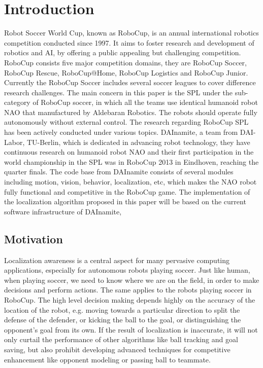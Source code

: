 \chapter{Introduction\label{cha:chapter1}}

Robot Soccer World Cup, known as RoboCup, is an annual international robotics competition conducted since 1997. It aims to foster research and development of robotics and \gls{AI}, by offering a public appealing but challenging competition. RoboCup consists five major competition domains, they are RoboCup Soccer, RoboCup Rescue, RoboCup@Home, RoboCup Logistics and RoboCup Junior. Currently the RoboCup Soccer includes several soccer leagues to cover difference research challenges. The main concern in this paper is the \gls{SPL} under the sub-category of RoboCup soccer, in which all the teams use identical humanoid robot NAO that manufactured by Aldebaran Robotics. The robots should operate fully autonomously without external control. 
The research regarding RoboCup \gls{SPL} has been actively conducted under various topics. DAInamite, a team from DAI-Labor, TU-Berlin, which is dedicated in advancing robot technology, they have continuous research on humanoid robot NAO and their first participation in the world championship in the \gls{SPL} was in RoboCup 2013 in Eindhoven, reaching the quarter finals. The code base from DAInamite consists of several modules including motion, vision, behavior, localization, etc, which makes the NAO robot fully functional and competitive in the RoboCup game.
The implementation of the localization algorithm proposed in this paper will be based on the current software infrastructure of DAInamite,  

\section{Motivation\label{sec:moti}}
Localization awareness is a central aspect for many pervasive computing applications, especially for autonomous robots playing soccer. Just like human,  when playing soccer, we need to know where we are on the field, in order to make decisions and perform actions. The same applies to the robots playing soccer in RoboCup. The high level decision making depends highly on the accuracy of the location of the robot, e.g. moving towards a particular direction to split the defense of the defender, or kicking the ball to the goal, or distinguishing the opponent's goal from its own. If the result of localization is inaccurate, it will not only curtail the performance of other algorithms like ball tracking and goal saving, but also prohibit developing advanced techniques for competitive enhancement like opponent modeling or passing ball to teammate. 

